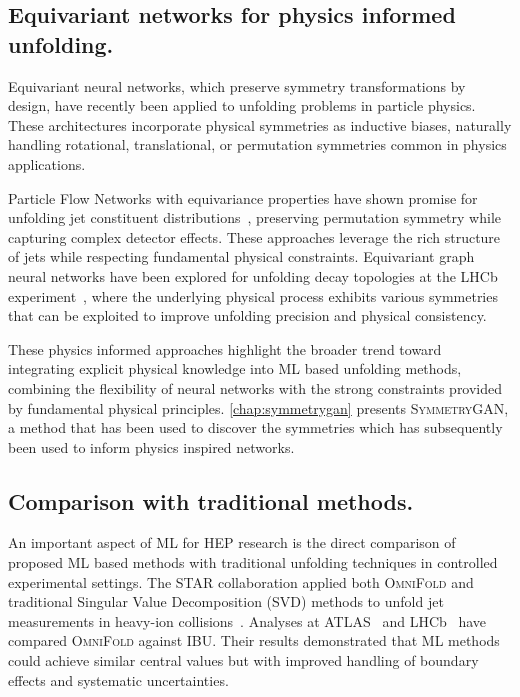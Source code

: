 \subsection{Equivariant networks for physics informed unfolding.}

    Equivariant neural networks, which preserve symmetry transformations by design, have recently been applied to unfolding problems in particle physics.
    These architectures incorporate physical symmetries as inductive biases, naturally handling rotational, translational, or permutation symmetries common in physics applications.

    Particle Flow Networks with equivariance properties have shown promise for unfolding jet constituent distributions~\cite{andreassen_omnifold_2020}, preserving permutation symmetry while capturing complex detector effects. 
    These approaches leverage the rich structure of jets while respecting fundamental physical constraints.
    Equivariant graph neural networks have been explored for unfolding decay topologies at the LHCb experiment~\cite{Delaney:2023swp,GarciaPardinas:2023pmx,Correia:2025deq}, where the underlying physical process exhibits various symmetries that can be exploited to improve unfolding precision and physical consistency.

    These physics informed approaches highlight the broader trend toward integrating explicit physical knowledge into ML based unfolding methods, combining the flexibility of neural networks with the strong constraints provided by fundamental physical principles.
    \cref{chap:symmetrygan} presents \textsc{SymmetryGAN}, a method that has been used to discover the symmetries which has subsequently been used to inform physics inspired networks.

\subsection{Comparison with traditional methods.}
    An important aspect of ML for HEP research is the direct comparison of proposed ML based methods with traditional unfolding techniques in controlled experimental settings.
    The STAR collaboration applied both \textsc{OmniFold} and traditional Singular Value Decomposition (SVD) methods to unfold jet measurements in heavy-ion collisions~\cite{song_measurement_2023}.
    Analyses at ATLAS~\cite{collaboration_measurement_2025} and LHCb~\cite{collaboration_multidifferential_2023} have compared \textsc{OmniFold} against IBU.
    Their results demonstrated that ML methods could achieve similar central values but with improved handling of boundary effects and systematic uncertainties.
    
